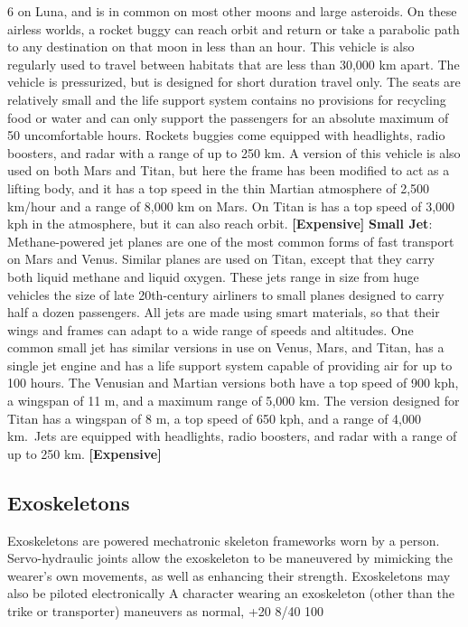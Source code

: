 6
on Luna, and is in common on most other moons 
and large asteroids. On these airless worlds, a rocket 
buggy can reach orbit and return or take a parabolic 
path to any destination on that moon in less than 
an hour. This vehicle is also regularly used to travel 
between habitats that are less than 30,000 km apart. 
The vehicle is pressurized, but is designed for short 
duration travel only. The seats are relatively small 
and the life support system contains no provisions 
for recycling food or water and can only support the 
passengers for an absolute maximum of 50 uncomfortable
hours. Rockets buggies come equipped with
headlights, radio boosters, and radar with a range of 
up to 250 km.
A version of this vehicle is also used on both Mars 
and Titan, but here the frame has been modified to 
act as a lifting body, and it has a top speed in the thin 
Martian atmosphere of 2,500 km/hour and a range 
of 8,000 km on Mars. On Titan is has a top speed 
of 3,000 kph in the atmosphere, but it can also reach 
orbit. \textbf{[Expensive]}
\textbf{Small Jet}: Methane-powered jet planes are one of 
the most common forms of fast transport on Mars 
and Venus. Similar planes are used on Titan, except 
that they carry both liquid methane and liquid oxygen. 
These jets range in size from huge vehicles the size of 
late 20th-century airliners to small planes designed to 
carry half a dozen passengers. All jets are made using 
smart materials, so that their wings and frames can 
adapt to a wide range of speeds and altitudes. One 
common small jet has similar versions in use on Venus, 
Mars, and Titan, has a single jet engine and has a life 
support system capable of providing air for up to 100 
hours. The Venusian and Martian versions both have 
a top speed of 900 kph, a wingspan of 11 m, and a 
maximum range of 5,000 km. The version designed 
for Titan has a wingspan of 8 m, a top speed of 650 
kph, and a range of 4,000 km. Jets are equipped with 
headlights, radio boosters, and radar with a range of 
up to 250 km. \textbf{[Expensive]}

\subsection{Exoskeletons}

Exoskeletons are powered mechatronic skeleton 
frameworks worn by a person. Servo-hydraulic joints 
allow the exoskeleton to be maneuvered by mimicking
the wearer's own movements, as well as enhancing
their strength. Exoskeletons may also be piloted electronically
A character wearing an exoskeleton (other
than the trike or transporter) maneuvers as normal, 
+20
8/40
100

